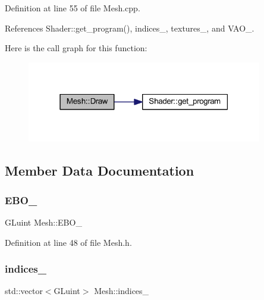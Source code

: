 Definition at line 55 of file Mesh.\+cpp.



References Shader\+::get\+\_\+program(), indices\+\_\+, textures\+\_\+, and V\+A\+O\+\_\+.

Here is the call graph for this function\+:\nopagebreak
\begin{figure}[H]
\begin{center}
\leavevmode
\includegraphics[width=291pt]{classMesh_a143c8d7c179801c6377853db26d4a19f_cgraph}
\end{center}
\end{figure}


\subsection{Member Data Documentation}
\mbox{\label{classMesh_a4748e3b51532876095f2695e3cb57208}} 
\subsubsection{\texorpdfstring{E\+B\+O\+\_\+}{EBO\_}}
{\footnotesize\ttfamily G\+Luint Mesh\+::\+E\+B\+O\+\_\+\hspace{0.3cm}{\ttfamily [private]}}



Definition at line 48 of file Mesh.\+h.

\mbox{\label{classMesh_ad0141809802020d763f082258a185d0f}} 
\subsubsection{\texorpdfstring{indices\+\_\+}{indices\_}}
{\footnotesize\ttfamily std\+::vector$<$G\+Luint$>$ Mesh\+::indices\+\_\+\hspace{0.3cm}{\ttfamily [private]}}



